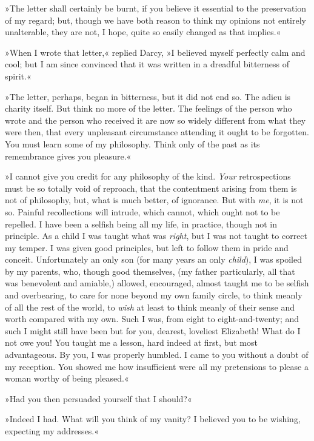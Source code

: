 »The letter shall certainly be burnt, if you believe it essential to the preservation of my regard; but, though we have both reason to think my opinions not entirely unalterable, they are not, I hope, quite so easily changed as that implies.«

»When I wrote that letter,« replied Darcy, »I believed myself perfectly calm and cool; but I am since convinced that it was written in a dreadful bitterness of spirit.«

»The letter, perhaps, began in bitterness, but it did not end so. The adieu is charity itself. But think no more of the letter. The feelings of the person who wrote and the person who received it are now so widely different from what they were then, that every unpleasant circumstance attending it ought to be forgotten. You must learn some of my philosophy. Think only of the past as its remembrance gives you pleasure.«

»I cannot give you credit for any philosophy of the kind. \textit{Your} retrospections must be so totally void of reproach, that the contentment arising from them is not of philosophy, but, what is much better, of ignorance. But with \textit{me}, it is not so. Painful recollections will intrude, which cannot, which ought not to be repelled. I have been a selfish being all my life, in practice, though not in principle. As a child I was taught what was \textit{right}, but I was not taught to correct my temper. I was given good principles, but left to follow them in pride and conceit. Unfortunately an only son (for many years an only \textit{child}), I was spoiled by my parents, who, though good themselves, (my father particularly, all that was benevolent and amiable,) allowed, encouraged, almost taught me to be selfish and overbearing, to care for none beyond my own family circle, to think meanly of all the rest of the world, to \textit{wish} at least to think meanly of their sense and worth compared with my own. Such I was, from eight to eight-and-twenty; and such I might still have been but for you, dearest, loveliest Elizabeth! What do I not owe you! You taught me a lesson, hard indeed at first, but most advantageous. By you, I was properly humbled. I came to you without a doubt of my reception. You showed me how insufficient were all my pretensions to please a woman worthy of being pleased.«

»Had you then persuaded yourself that I should?«

»Indeed I had. What will you think of my vanity? I believed you to be wishing, expecting my addresses.«

